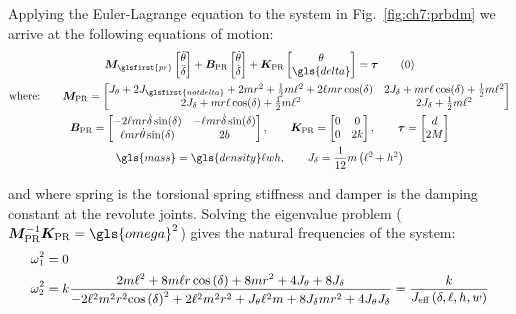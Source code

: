 Applying the Euler-Lagrange equation to the system in Fig.~\ref{fig:ch7:prbdm} we arrive at the following equations of motion:
\begin{gather}
\bm{M}_{\glsfirst{pr}} \begin{bmatrix}
\ddot{\theta} \\ \ddot{\delta}
\end{bmatrix}  + \bm{B}_{\text{PR}} \begin{bmatrix}
\dot{\theta} \\ \dot{\delta}
\end{bmatrix} + \bm{K}_{\text{PR}} \begin{bmatrix}
{\theta} \\ {\gls{delta}}
\end{bmatrix} = \bm{\tau} \tag{\theequation}  \\
\begin{gathered}
\text{where:} \qquad \bm{M}_{\text{PR}} = \begin{bmatrix}
J_\theta + 2J_{\glsfirst{notdelta}} + 2 m r^2 + \frac{1}{2}m\ell^2 + 2 \ell m r \cos(\delta) & 2J_\delta + mr\ell\cos(\delta) + \frac{1}{2}m\ell^2 \\
2J_\delta + mr\ell\cos(\delta) + \frac{1}{2}m\ell^2 & 2J_\delta + \frac{1}{2}m\ell^2
\end{bmatrix}  \\
\bm{B}_{\text{PR}} = \begin{bmatrix}
-2\ell m r \dot{\delta} \sin(\delta) & - \ell m r \dot{\delta}\sin(\delta) \\
\ell m r \dot{\theta} \sin(\delta) & 2b
\end{bmatrix}, \qquad \bm{K}_{\text{PR}} = \begin{bmatrix}
0 & 0 \\ 0 & 2k
\end{bmatrix}, \qquad
\bm{\tau} = \begin{bmatrix} d \\ 2M \end{bmatrix}
\notag \\
\gls{mass} = \gls{density} \ell w h, \qquad J_{\delta} = \frac{1}{12}m \left(\ell^2 + h^2\right)
\end{gathered} \notag
\end{gather}

\noindent and where \gls{spring} is the torsional spring stiffness and \gls{damper} is the damping constant at the revolute joints. Solving the eigenvalue problem ($\bm{M}_{\text{PR}}^{-1}\bm{K}_{\text{PR}} = \gls{omega}^2$) gives the natural frequencies of the system: 
\begin{subequations}
\small
\begin{align}
\omega_1^2 &= 0 \\
\omega_2^2 &= k \frac{2 m \ell^2 + 8 m \ell r \cos\left(\delta\right) + 8 m r^2 + 4 J_{\theta} + 8 J_{\delta}}{ - 2\ell^2 m^2 r^2 {\cos\left(\delta\right)}^2 + 2 \ell^2 m^2 r^2 + J_{\theta} \ell^2 m + 8 J_{\delta} m r^2 + 4 J_{\theta} J_{\delta}} = \frac{k}{J_{\text{eff}}\left(\delta,\ell,h,w\right)} 
\end{align}
\end{subequations}

